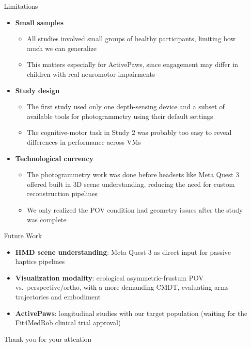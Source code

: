 \documentclass[aspectratio=169, 12pt]{beamer}
\begin{document}
\begin{frame}{Limitations}
	\begin{itemize}
		\item \textbf{Small samples}
		\begin{itemize}
			\small
			\item All studies involved small groups of healthy participants, limiting how much we can generalize
			\item This matters especially for ActivePaws, since engagement may differ in children with real neuromotor impairments
		\end{itemize}

		\vspace{0.2cm}
		\item \textbf{Study design}
		\begin{itemize}
			\small
			\item The first study used only one depth-sensing device and a subset of available tools for photogrammetry using their default settings
			\item The cognitive-motor task in Study 2 was probably too easy to reveal differences in performance across VMs
		\end{itemize}

		\vspace{0.2cm}
		\item \textbf{Technological currency}
		\begin{itemize}
			\small
			\item The photogrammetry work was done before headsets like Meta Quest 3 offered built in 3D scene understanding, reducing the need for custom reconstruction pipelines
			\item We only realized the POV condition had geometry issues after the study was complete
		\end{itemize}
	\end{itemize}
\end{frame}

\begin{frame}{Future Work}
\begin{itemize}
    \item \textbf{HMD scene understanding}: Meta Quest 3 as direct input for passive haptics pipelines
    \item \textbf{Visualization modality}: ecological asymmetric-frustum POV vs.\ perspective/ortho, with a more demanding CMDT, evaluating arms trajectories and embodiment
    \item \textbf{ActivePaws}: longitudinal studies with our target population (waiting for the Fit4MedRob clinical trial approval)
\end{itemize}
\end{frame}

\begin{frame}{}
\centering
{\Huge Thank you for your attention}
\end{frame}
\end{document}
